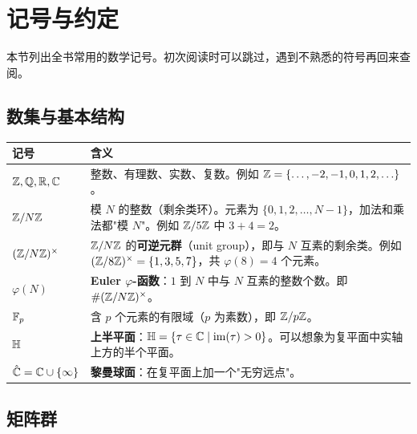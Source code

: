 \section*{记号与约定}
\label{sec:notation}

本节列出全书常用的数学记号。初次阅读时可以跳过，遇到不熟悉的符号再回来查阅。

\subsection*{数集与基本结构}

\begin{longtable}{@{}p{3.5cm}p{10cm}@{}}
\toprule
\textbf{记号} & \textbf{含义} \\
\midrule
$\mathbb{Z}, \mathbb{Q}, \mathbb{R}, \mathbb{C}$ &
  整数、有理数、实数、复数。例如 $\mathbb{Z} = \{\ldots, -2, -1, 0, 1, 2, \ldots\}$。 \\[4pt]
$\mathbb{Z}/N\mathbb{Z}$ &
  模 $N$ 的整数（剩余类环）。元素为 $\{0, 1, 2, \ldots, N-1\}$，加法和乘法都"模 $N$"。例如 $\mathbb{Z}/5\mathbb{Z}$ 中 $3 + 4 = 2$。 \\[4pt]
$(\mathbb{Z}/N\mathbb{Z})^\times$ &
  $\mathbb{Z}/N\mathbb{Z}$ 的\textbf{可逆元群}（unit group），即与 $N$ 互素的剩余类。例如 $(\mathbb{Z}/8\mathbb{Z})^\times = \{1, 3, 5, 7\}$，共 $\varphi(8) = 4$ 个元素。 \\[4pt]
$\varphi(N)$ &
  \textbf{Euler $\varphi$-函数}：$1$ 到 $N$ 中与 $N$ 互素的整数个数。即 $\#(\mathbb{Z}/N\mathbb{Z})^\times$。 \\[4pt]
$\mathbb{F}_p$ &
  含 $p$ 个元素的有限域（$p$ 为素数），即 $\mathbb{Z}/p\mathbb{Z}$。 \\[4pt]
$\mathbb{H}$ &
  \textbf{上半平面}：$\mathbb{H} = \{\tau \in \mathbb{C} \mid \operatorname{im}(\tau) > 0\}$。可以想象为复平面中实轴上方的半个平面。 \\[4pt]
$\hat{\mathbb{C}} = \mathbb{C} \cup \{\infty\}$ &
  \textbf{黎曼球面}：在复平面上加一个"无穷远点"。 \\
\bottomrule
\end{longtable}

\subsection*{矩阵群}

